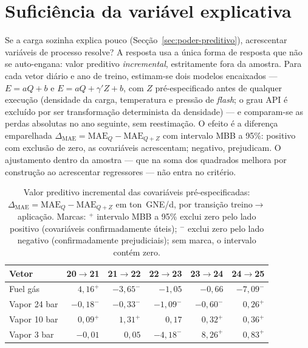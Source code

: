 \section{Suficiência da variável explicativa}
\label{sec:suficiencia}


Se a carga sozinha explica pouco (Secção~\ref{sec:poder-preditivo}), acrescentar
variáveis de processo resolve? A resposta usa a única forma de
resposta que não se auto-engana: valor preditivo \emph{incremental},
estritamente fora da amostra. Para cada vetor diário e ano de treino,
estimam-se dois modelos encaixados --- $E = aQ + b$ e $E = aQ + \gamma'Z + b$,
com $Z$ pré-especificado antes de qualquer execução (densidade da carga,
temperatura e pressão de \emph{flash}; o grau API é excluído por ser
transformação determinista da densidade) --- e comparam-se as perdas absolutas
no ano seguinte, sem reestimação. O efeito é a diferença emparelhada
$\Delta_{\mathrm{MAE}} = \mathrm{MAE}_{Q} - \mathrm{MAE}_{Q+Z}$ com intervalo
MBB a 95\%: positivo com exclusão de zero, as covariáveis acrescentam;
negativo, prejudicam. O ajustamento dentro da amostra --- que na soma dos
quadrados melhora por construção ao acrescentar regressores --- não entra no
critério.

\begin{table}[htbp]
  \centering
  \caption[Valor incremental das covariáveis]{Valor preditivo
  incremental das covariáveis pré-especificadas:
  $\Delta_{\mathrm{MAE}} = \mathrm{MAE}_{Q} - \mathrm{MAE}_{Q+Z}$ em
  ton~GNE/d, por transição treino${\to}$aplicação. Marcas: $^{+}$ intervalo
  MBB a 95\% exclui zero pelo lado positivo (covariáveis confirmadamente
  úteis); $^{-}$ exclui zero pelo lado negativo (confirmadamente
  prejudiciais); sem marca, o intervalo contém zero.}
  \label{tab:covariaveis-incremental}
  \begin{tabular}{lrrrrr}
    \toprule
    Vetor & \multicolumn{1}{c}{20${\to}$21} & \multicolumn{1}{c}{21${\to}$22}
    & \multicolumn{1}{c}{22${\to}$23} & \multicolumn{1}{c}{23${\to}$24}
    & \multicolumn{1}{c}{24${\to}$25} \\
    \midrule
    Fuel gás     & $4{,}16^{+}$  & $-3{,}65^{-}$ & $-1{,}05$      & $-0{,}66$     & $-7{,}09^{-}$ \\
    Vapor 24 bar & $-0{,}18^{-}$ & $-0{,}33^{-}$ & $-1{,}09^{-}$  & $-0{,}60^{-}$ & $0{,}26^{+}$  \\
    Vapor 10 bar & $0{,}09^{+}$  & $1{,}31^{+}$  & $0{,}17$       & $0{,}32^{+}$  & $0{,}36^{+}$  \\
    Vapor 3 bar  & $-0{,}01$     & $0{,}05$      & $-4{,}18^{-}$  & $8{,}26^{+}$  & $0{,}83^{+}$  \\
    \bottomrule
  \end{tabular}
\end{table}

